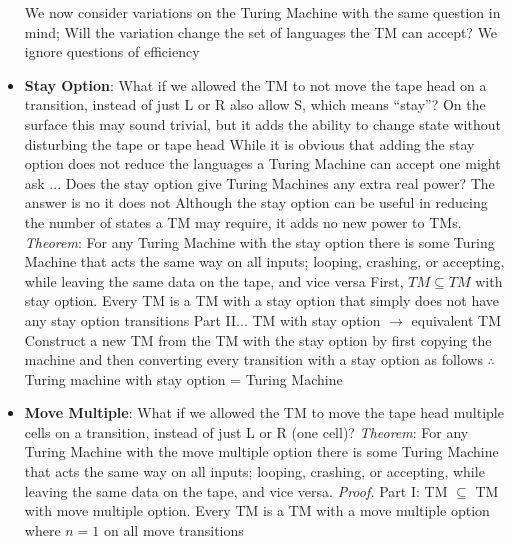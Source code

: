 \documentclass{report}
\begin{document}
\begin{itemize}
            \bigbreak \noindent 
            We now consider variations on the Turing Machine with the same question in mind; Will the variation change the set of languages the TM can accept?
            \bigbreak \noindent 
            We ignore questions of efficiency
        \item \textbf{Stay Option}: What if we allowed the TM to not move the tape head on a transition, instead of just L or R also allow S, which means “stay”?
            \bigbreak \noindent 
            On the surface this may sound trivial, but it adds the ability to change state without disturbing the tape or tape head
            \bigbreak \noindent 
            While it is obvious that adding the stay option does not reduce the languages a Turing Machine can accept one might ask ... Does the stay option give Turing Machines any extra real power? The answer is no it does not
            \bigbreak \noindent 
            Although the stay option can be useful in reducing the number of states a TM may require, it adds no new power to TMs.
            \bigbreak \noindent 
            \textit{Theorem}: For any Turing Machine with the stay option there is some Turing Machine that acts the same way on all inputs; looping, crashing, or accepting, while leaving the same data on the tape, and vice versa
            \bigbreak \noindent 
            First, $TM \subseteq TM$ with stay option. Every TM is a TM with a stay option that simply does not have any stay option transitions
            \bigbreak \noindent 
            Part II... TM with stay option $\to$ equivalent TM
            \bigbreak \noindent 
            Construct a new TM from the TM with the stay option by first copying the machine and then converting every transition with a stay option as follows
            \bigbreak \noindent 
            \bigbreak \noindent 
            $\therefore$ Turing machine with stay option = Turing Machine
        \item \textbf{Move Multiple}: What if we allowed the TM to move the tape head multiple cells on a transition, instead of just L or R (one cell)?
            \bigbreak \noindent 
            \textit{Theorem}: For any Turing Machine with the move multiple option there is some Turing Machine that acts the same way on all inputs; looping, crashing, or accepting, while leaving the same data on the tape, and vice versa.
            \bigbreak \noindent 
            \textit{Proof.} Part I: TM $\subseteq$ TM with move multiple option. Every TM is a TM with a move multiple option where $n=1$ on all move transitions

\end{itemize}
\end{document}
